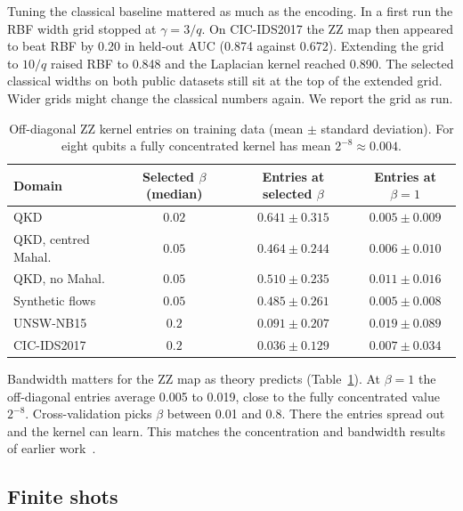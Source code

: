 \documentclass[pdflatex,sn-mathphys-num,lineno]{sn-jnl}
\theoremstyle{thmstyleone}
\begin{document}
Tuning the classical baseline mattered as much as the encoding. In a first run the RBF width grid stopped at $\gamma=3/q$. On CIC-IDS2017 the ZZ map then appeared to beat RBF by 0.20 in held-out AUC (0.874 against 0.672). Extending the grid to $10/q$ raised RBF to 0.848 and the Laplacian kernel reached 0.890. The selected classical widths on both public datasets still sit at the top of the extended grid. Wider grids might change the classical numbers again. We report the grid as run.

\begin{table}[t]
  \centering
  \caption{Off-diagonal ZZ kernel entries on training data (mean $\pm$ standard
  deviation). For eight qubits a fully concentrated kernel has mean $2^{-8}\approx0.004$.}
  \label{tab:conc}
  \small
  \begin{tabular}{lccc}
    \toprule
    Domain & Selected $\beta$ (median) & Entries at selected $\beta$ & Entries at $\beta=1$ \\
    \midrule
    QKD & $0.02$ & $0.641\pm0.315$ & $0.005\pm0.009$ \\
    QKD, centred Mahal. & $0.05$ & $0.464\pm0.244$ & $0.006\pm0.010$ \\
    QKD, no Mahal. & $0.05$ & $0.510\pm0.235$ & $0.011\pm0.016$ \\
    Synthetic flows & $0.05$ & $0.485\pm0.261$ & $0.005\pm0.008$ \\
    UNSW-NB15 & $0.2$ & $0.091\pm0.207$ & $0.019\pm0.089$ \\
    CIC-IDS2017 & $0.2$ & $0.036\pm0.129$ & $0.007\pm0.034$ \\
    \bottomrule
  \end{tabular}
\end{table}

Bandwidth matters for the ZZ map as theory predicts (Table~\ref{tab:conc}). At $\beta=1$ the off-diagonal entries average 0.005 to 0.019, close to the fully concentrated value $2^{-8}$. Cross-validation picks $\beta$ between 0.01 and 0.8. There the entries spread out and the kernel can learn. This matches the concentration and bandwidth results of earlier work~\cite{thanasilp2024exponential,shaydulin2022importance,canatar2022bandwidth}.

\subsection{Finite shots}
\label{sec:shots}
\end{document}
